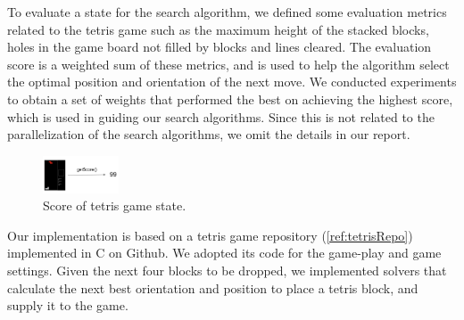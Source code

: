 To evaluate a state for the search algorithm, we defined some evaluation metrics related to the tetris game such as the maximum height of the stacked blocks, holes in the game board not filled by blocks and lines cleared. The evaluation score is a weighted sum of these metrics, and is used to help the algorithm select the optimal position and orientation of the next move. We conducted experiments to obtain a set of weights that performed the best on achieving the highest score, which is used in guiding our search algorithms. Since this is not related to the parallelization of the search algorithms, we omit the details in our report.

\begin{figure}[h]
	\centering
	\includegraphics[width=0.2\textwidth]{score.png}
	\vspace{-1em}
	\caption{Score of tetris game state.}
	\label{fig:score}
\end{figure}

Our implementation is based on a tetris game repository (\ref{ref:tetrisRepo}) implemented in C on Github. We adopted its code for the game-play and game settings. Given the next four blocks to be dropped, we implemented solvers that calculate the next best orientation and position to place a tetris block, and supply it to the game. 

